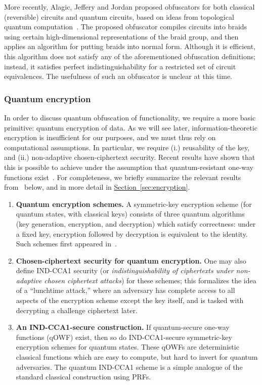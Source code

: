 \documentclass[envcountsame]{llncs}
\numberwithin{equation}{section}
\newcommand{\expref}[2]{\texorpdfstring{\hyperref[#2]{#1~\ref{#2}}}{#1~\ref{#2}}}
\begin{document}
More recently, Alagic, Jeffery and Jordan proposed obfuscators for both classical (reversible) circuits and quantum circuits, based on ideas from topological quantum computation~\cite{AJJ14}. The proposed obfuscator compiles circuits into braids using certain high-dimensional representations of the braid group, and then applies an algorithm for putting braids into normal form. Although it is efficient, this algorithm does not satisfy any of the aforementioned obfuscation definitions; instead, it satisfies perfect indistinguishability for a restricted set of circuit equivalences. The usefulness of such an obfuscator is unclear at this time.

\subsubsection{Quantum encryption}

In order to discuss quantum obfuscation of functionality, we require a more basic primitive: quantum encryption of data. As we will see later, information-theoretic encryption is insufficient for our purposes, and we must thus rely on computational assumptions. In particular, we require (i.) reusability of the key, and (ii.) non-adaptive chosen-ciphertext security. Recent results have shown that this is possible to achieve under the assumption that quantum-resistant one-way functions exist~\cite{ABFGSS16}. For completeness, we briefly summarize the relevant results from~\cite{ABFGSS16} below, and in more detail in \expref{Section}{sec:encryption}.
\begin{enumerate}
\item \textbf{Quantum encryption schemes.} A symmetric-key encryption scheme (for quantum states, with classical keys) consists of three quantum algorithms (key generation, encryption, and decryption) which satisfy correctness: under a fixed key, encryption followed by decryption is equivalent to the identity. Such schemes first appeared in~\cite{BJ15}.
\item \textbf{Chosen-ciphertext security for quantum encryption.} One may also define IND-CCA1 security (or \emph{indistinguishability of ciphertexts under non-adaptive chosen ciphertext attacks}) for these schemes; this formalizes the idea of a ``lunchtime attack,'' where an adversary has complete access to all aspects of the encryption scheme except the key itself, and is tasked with decrypting a challenge ciphertext later. 
\item \textbf{An IND-CCA1-secure construction.} If quantum-secure one-way functions (qOWF) exist, then so do IND-CCA1-secure symmetric-key encryption schemes for quantum states. These qOWFs are deterministic classical functions which are easy to compute, but hard to invert for quantum adversaries. The quantum IND-CCA1 scheme is a simple analogue of the standard classical construction using PRFs.
\end{enumerate}
\end{document}
